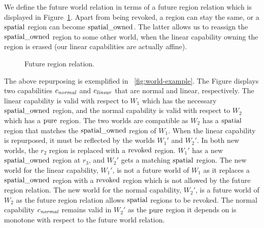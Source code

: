 \begin{jversion}
We define the future world relation in terms of a future region relation which is displayed in Figure~\ref{fig:ft-reg-rel}.
Apart from being revoked, a region can stay the same, or a $\mathrm{spatial}$ region can become $\mathrm{spatial\_owned}$.
The latter allows us to reassign the $\mathrm{spatial\_owned}$ region to some other world, when the linear capability owning the region is erased (our linear capabilities are actually affine).
\begin{figure}[htb]
  \centering
  \caption{Future region relation.}
  \label{fig:ft-reg-rel}
\end{figure}
The above repurposing is exemplified in \figurename~\ref{fig:world-example}.
The Figure displays two capabilities $c_{\mathit{normal}}$ and $c_{\mathit{linear}}$ that are normal and linear, respectively.
The linear capability is valid with respect to $W_1$ which has the necessary $\mathrm{spatial\_owned}$ region, and the normal capability is valid with respect to $W_2$ which has a $\mathrm{pure}$ region.
The two worlds are compatible as $W_2$ has a $\mathrm{spatial}$ region that matches the $\mathrm{spatial\_owned}$ region of $W_1$.
When the linear capability is repurposed, it must be reflected by the worlds $W_1'$ and $W_2'$.
In both new worlds, the $r_2$ region is replaced with a $\mathrm{revoked}$ region.
$W_1'$ has a new $\mathrm{spatial\_owned}$ region at $r_3$, and $W_2'$ gets a matching $\mathrm{spatial}$ region.
The new world for the linear capability, $W_1'$, is not a future world of $W_1$ as it replaces a $\mathrm{spatial\_owned}$ region with a $\mathrm{revoked}$ region which is not allowed by the future region relation.
The new world for the normal capability, $W_2'$, is a future world of $W_2$ as the future region relation allows $\mathrm{spatial}$ regions to be revoked.
The normal capability $c_{\mathit{normal}}$ remains valid in $W_2'$ as the $\mathrm{pure}$ region it depends on is monotone with respect to the future world relation.
\begin{figure}\centering
  
\end{figure}
\end{jversion}
